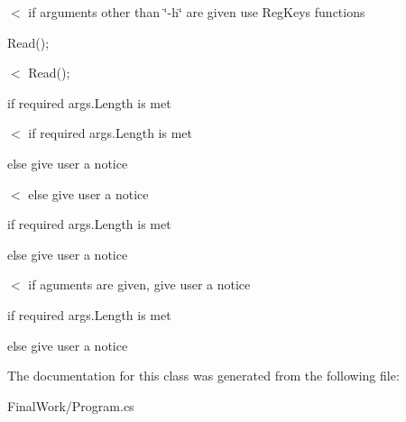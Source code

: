 $<$ if arguments other than \char`\"{}-\/h\char`\"{} are given use Reg\+Keys functions

Read();

$<$ Read();

if required args.\+Length is met

$<$ if required args.\+Length is met

else give user a notice

$<$ else give user a notice

if required args.\+Length is met

else give user a notice

$<$ if aguments are given, give user a notice

if required args.\+Length is met

else give user a notice 

The documentation for this class was generated from the following file\+:\begin{DoxyCompactItemize}
\item 
Final\+Work/Program.\+cs\end{DoxyCompactItemize}
